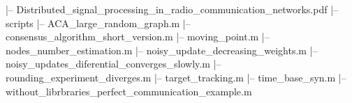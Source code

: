 \begtt

|-- Distributed_signal_processing_in_radio_communication_networks.pdf
|-- scripts
    |-- ACA_large_random_graph.m
    |-- consensus_algorithm_short_version.m
    |-- moving_point.m
    |-- nodes_number_estimation.m
    |-- noisy_update_decreasing_weights.m
    |-- noisy_updates_diferential_converges_slowly.m
    |-- rounding_experiment_diverges.m
    |-- target_tracking.m
    |-- time_base_syn.m
    |-- without_librbraries_perfect_communication_example.m
\endtt
